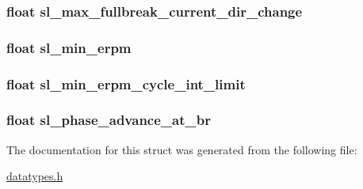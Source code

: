 \subsubsection[{sl\+\_\+max\+\_\+fullbreak\+\_\+current\+\_\+dir\+\_\+change}]{\setlength{\rightskip}{0pt plus 5cm}float sl\+\_\+max\+\_\+fullbreak\+\_\+current\+\_\+dir\+\_\+change}\label{structmc__configuration_a9e6ad133da71aca2d364a8ada768c353}
\hypertarget{structmc__configuration_af80f4859ec2d84aa984c97ef356b758b}{}
\subsubsection[{sl\+\_\+min\+\_\+erpm}]{\setlength{\rightskip}{0pt plus 5cm}float sl\+\_\+min\+\_\+erpm}\label{structmc__configuration_af80f4859ec2d84aa984c97ef356b758b}
\hypertarget{structmc__configuration_aee0b0da633a6ebee014202131b4ac861}{}
\subsubsection[{sl\+\_\+min\+\_\+erpm\+\_\+cycle\+\_\+int\+\_\+limit}]{\setlength{\rightskip}{0pt plus 5cm}float sl\+\_\+min\+\_\+erpm\+\_\+cycle\+\_\+int\+\_\+limit}\label{structmc__configuration_aee0b0da633a6ebee014202131b4ac861}
\hypertarget{structmc__configuration_af9abc755b896ab32e4977132ed46bcd0}{}
\subsubsection[{sl\+\_\+phase\+\_\+advance\+\_\+at\+\_\+br}]{\setlength{\rightskip}{0pt plus 5cm}float sl\+\_\+phase\+\_\+advance\+\_\+at\+\_\+br}\label{structmc__configuration_af9abc755b896ab32e4977132ed46bcd0}


The documentation for this struct was generated from the following file\+:\begin{DoxyCompactItemize}
\item 
\hyperlink{datatypes_8h}{datatypes.\+h}\end{DoxyCompactItemize}
